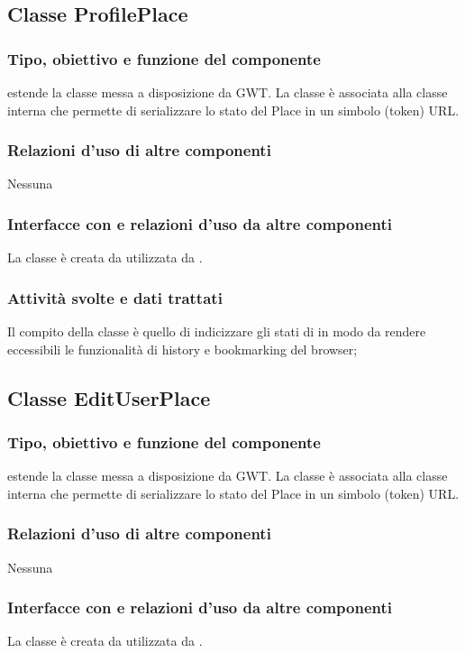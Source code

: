 \subsection{Classe ProfilePlace}
\subsubsection*{Tipo, obiettivo e funzione del componente}
 estende la classe  messa a disposizione da GWT. La
classe \`e associata alla classe interna  che permette di
serializzare lo stato del Place in un simbolo (token) URL.
\subsubsection*{Relazioni d'uso di altre componenti}
Nessuna
\subsubsection*{Interfacce con e relazioni d'uso da altre componenti}
La classe \`e creata da  utilizzata da .
\subsubsection*{Attivit\`a svolte e dati trattati}
Il compito della classe \`e quello di indicizzare gli stati di
 in modo da rendere eccessibili le funzionalit\`a di history
e bookmarking del browser;

\subsection{Classe EditUserPlace}
\subsubsection*{Tipo, obiettivo e funzione del componente}
 estende la classe  messa a disposizione da GWT. La
classe \`e associata alla classe interna  che permette di
serializzare lo stato del Place in un simbolo (token) URL.
\subsubsection*{Relazioni d'uso di altre componenti}
Nessuna
\subsubsection*{Interfacce con e relazioni d'uso da altre componenti}
La classe \`e creata da  utilizzata da .
